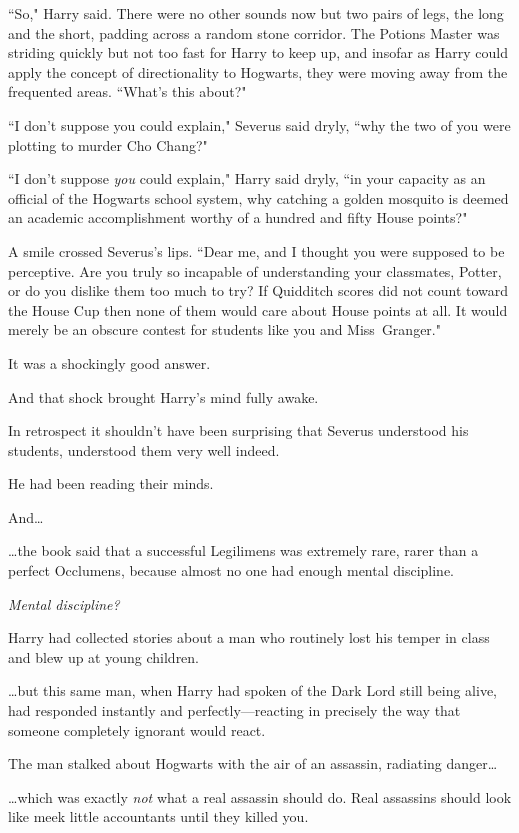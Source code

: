 \later

``So," Harry said. There were no other sounds now but two pairs of legs, the long and the short, padding across a random stone corridor. The Potions Master was striding quickly but not too fast for Harry to keep up, and insofar as Harry could apply the concept of directionality to Hogwarts, they were moving away from the frequented areas. ``What's this about?"

``I don't suppose you could explain," Severus said dryly, ``why the two of you were plotting to murder Cho Chang?"

``I don't suppose \emph{you} could explain," Harry said dryly, ``in your capacity as an official of the Hogwarts school system, why catching a golden mosquito is deemed an academic accomplishment worthy of a hundred and fifty House points?"

A smile crossed Severus's lips. ``Dear me, and I thought you were supposed to be perceptive. Are you truly so incapable of understanding your classmates, Potter, or do you dislike them too much to try? If Quidditch scores did not count toward the House Cup then none of them would care about House points at all. It would merely be an obscure contest for students like you and Miss~Granger."

It was a shockingly good answer.

And that shock brought Harry's mind fully awake.

In retrospect it shouldn't have been surprising that Severus understood his students, understood them very well indeed.

He had been reading their minds.

And{\ldots}

{\ldots}the book said that a successful Legilimens was extremely rare, rarer than a perfect Occlumens, because almost no one had enough mental discipline.

\emph{Mental discipline?}

Harry had collected stories about a man who routinely lost his temper in class and blew up at young children.

{\ldots}but this same man, when Harry had spoken of the Dark Lord still being alive, had responded instantly and perfectly—reacting in precisely the way that someone completely ignorant would react.

The man stalked about Hogwarts with the air of an assassin, radiating danger{\ldots}

{\ldots}which was exactly \emph{not} what a real assassin should do. Real assassins should look like meek little accountants until they killed you.

